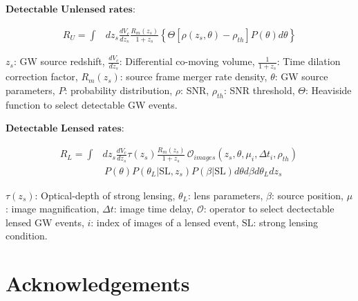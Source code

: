 \documentclass[10pt,a4paper,onecolumn]{article}
\begin{document}
\(\textbf{Detectable Unlensed rates:}\)

\begin{equation*}
\begin{split}
R_U = \int & dz_s \frac{dV_c}{dz_s}\frac{R_m(z_s)}{1+z_s}\left\{\Theta[\rho(z_s,\theta)-\rho_{th}] P(\theta) d\theta \right\}
\end{split}
\end{equation*}

\(z_s\): GW source redshift, \(\frac{dV_c}{dz_s}\): Differential
co-moving volume, \(\frac{1}{1+z_s}\): Time dilation correction factor,
\(R_m(z_s)\): source frame merger rate density, \(\theta\): GW source
parameters, \(P\): probability distribution, \(\rho\): SNR,
\(\rho_{th}\): SNR threshold, \(\Theta\): Heaviside function to select
detectable GW events.

\(\textbf{Detectable Lensed rates:}\)

\begin{equation*}
\begin{split}
R_L = \int & dz_s \frac{dV_c}{dz_s}\tau(z_s)\frac{R_m(z_s)}{1+z_s} \,\mathcal{O}_{images}(z_s,\theta,\mu_i,\Delta t_i, \rho_{th}) \, \\ 
& \, P(\theta) P(\theta_L|\text{SL},z_s) P(\beta|\text{SL}) d\theta d\beta d\theta_L dz_s 
\end{split}
\end{equation*}

\(\tau(z_s)\): Optical-depth of strong lensing, \(\theta_L\): lens
parameters, \(\beta\): source position, \(\mu\): image magnification,
\(\Delta t\): image time delay, \(\mathcal{O}\): operator to select
dectectable lensed GW events, \(i\): index of images of a lensed event,
\(\text{SL}\): strong lensing condition.

\section{Acknowledgements}\label{acknowledgements}
\end{document}
